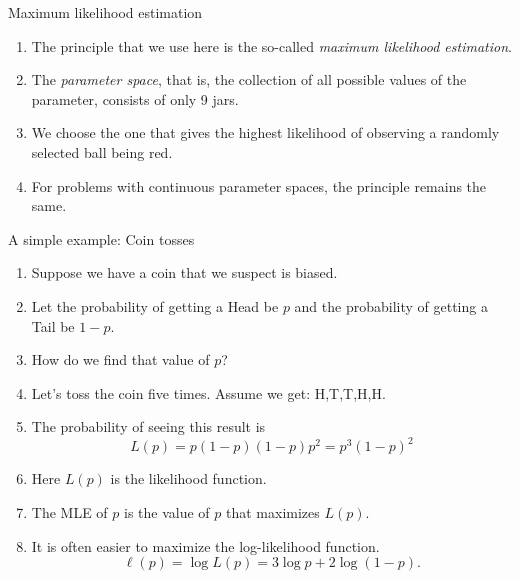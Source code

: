 \documentclass[serif,envcountsect,table,t,handout]{beamer}%
\begin{document}
\begin{frame}{Maximum likelihood estimation}
  \begin{enumerate}
  \item The principle that we use here is the so-called \emph{maximum likelihood
estimation}.
\item The \emph{parameter
space}, that is, the collection of all possible values of
the parameter, consists of only 9 jars. 
\item We choose the one that gives the highest
likelihood of observing a randomly selected ball being red.

\item 
For problems with continuous parameter spaces, the principle remains the
same.
  \end{enumerate}
\end{frame}
\begin{frame}{A simple example: Coin tosses}
  \begin{enumerate}
  \item Suppose we have a coin that we suspect is biased.
  \item Let the probability of getting a Head be $p$ and the probability of
  getting a Tail be $1-p$.
\item How do we find that value of $p$?
\item Let's toss the coin five times. Assume we get: H,T,T,H,H.
\item The probability of seeing this result is
  \begin{equation}
    L(p) = p(1-p)(1-p)p^2 = p^3(1-p)^2
    \label{eq:1}
  \end{equation}
\item Here $L(p)$ is the likelihood function.
\item The MLE of $p$ is the value of $p$ that maximizes $L(p)$.
\item It is often easier to maximize the log-likelihood function.
  \begin{equation}
    \ell(p) = \log L(p) = 3\log p + 2 \log(1-p). 
    \label{eq:2}
  \end{equation}
\end{enumerate}
\end{frame}
\end{document}

